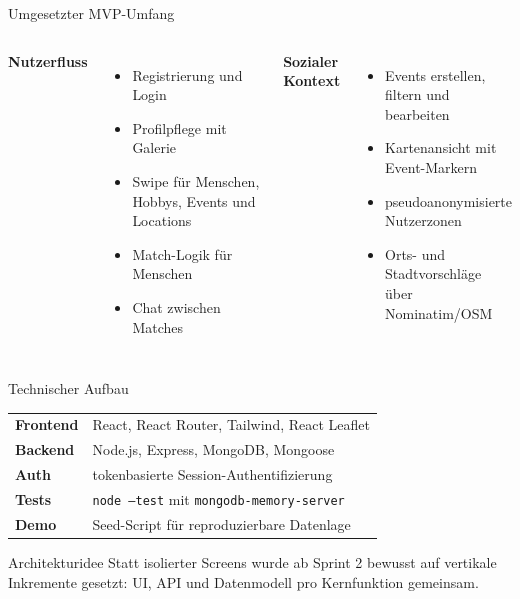 \documentclass[
amberg,
compressedtitleimages,
toc=fancy,
footlinebox,
nometaot
]{OTHAWbeamer}
\begin{document}
\begin{frame}{Umgesetzter MVP-Umfang}
  \begin{columns}[T]
    \textbf{Nutzerfluss}
    \begin{itemize}
      \item Registrierung und Login
      \item Profilpflege mit Galerie
      \item Swipe für Menschen, Hobbys, Events und Locations
      \item Match-Logik für Menschen
      \item Chat zwischen Matches
    \end{itemize}

    \textbf{Sozialer Kontext}
    \begin{itemize}
      \item Events erstellen, filtern und bearbeiten
      \item Kartenansicht mit Event-Markern
      \item pseudoanonymisierte Nutzerzonen
      \item Orts- und Stadtvorschläge über Nominatim/OSM \cite{nominatim}
    \end{itemize}
  \end{columns}
\end{frame}

\begin{frame}{Technischer Aufbau}
  \begin{tabularx}{\textwidth}{@{}>{\bfseries}l X@{}}
    Frontend & React, React Router, Tailwind, React Leaflet \\
    Backend & Node.js, Express, MongoDB, Mongoose \\
    Auth & tokenbasierte Session-Authentifizierung \\
    Tests & \texttt{node --test} mit \texttt{mongodb-memory-server} \\
    Demo & Seed-Script für reproduzierbare Datenlage \\
  \end{tabularx}

  \vspace{0.4cm}

  \begin{block}{Architekturidee}
    Statt isolierter Screens wurde ab Sprint 2 bewusst auf vertikale Inkremente gesetzt: UI, API und Datenmodell pro Kernfunktion gemeinsam.
  \end{block}
\end{frame}
\end{document}
